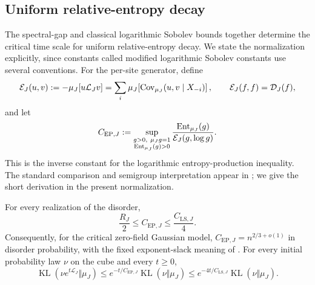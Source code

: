 \subsection{Uniform relative-entropy decay}

The spectral-gap and classical logarithmic Sobolev bounds together
determine the critical time scale for uniform relative-entropy decay.
We state the normalization
explicitly, since constants called modified logarithmic Sobolev constants
use several conventions. For the per-site generator, define
\[
 \mathcal E_J(u,v):=-\mu_J[u\mathcal L_Jv]
 =\sum_i\mu_J\!\left[\operatorname{Cov}_{\mu_J}(u,v\mid X_{-i})\right],
 \qquad \mathcal E_J(f,f)=\mathcal D_J(f),
\]
and let
\[
 C_{\mathrm{EP},J}:=
 \sup_{\substack{g>0,\ \mu_Jg=1\\ \operatorname{Ent}_{\mu_J}(g)>0}}
 \frac{\operatorname{Ent}_{\mu_J}(g)}{\mathcal E_J(g,\log g)}.
\]
This is the inverse constant for the logarithmic entropy-production
inequality. The standard comparison and semigroup interpretation appear
in \cite[Propositions~3.5--3.6 and Theorem~2.4]{BobkovTetali2006Modified};
we give the short derivation in the present normalization.

\begin{corollary}\label{cor:entropy-production}
For every realization of the disorder,
\[
 \frac{R_J}{2}\le C_{\mathrm{EP},J}\le\frac{C_{\mathrm{LS},J}}4.
\]
Consequently, for the critical zero-field Gaussian model,
$C_{\mathrm{EP},J}=n^{2/3+o(1)}$ in disorder probability, with the fixed
exponent-slack meaning of . For every initial probability
law $\nu$ on the cube and every $t\ge0$,
\[
 \operatorname{KL}(\nu e^{t\mathcal L_J}\Vert\mu_J)
 \le e^{-t/C_{\mathrm{EP},J}}\operatorname{KL}(\nu\Vert\mu_J)
 \le e^{-4t/C_{\mathrm{LS},J}}\operatorname{KL}(\nu\Vert\mu_J).
\]
\end{corollary}


